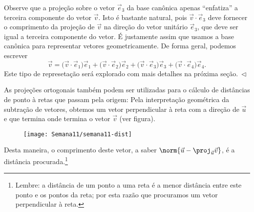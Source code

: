 \begin{ex}
\begin{equation}
	\end{equation} Observe que a projeção sobre o vetor $\vec{e}_3$ da base canônica apenas ``enfatiza'' a terceira componente do vetor $\vec{v}$. Isto é bastante natural, pois $\vec{v} \cdot \vec{e}_3$ deve fornecer o comprimento da projeção de $\vec{v}$ na direção do vetor unitário $\vec{e}_3$, que deve ser igual a terceira componente do vetor. É justamente assim que usamos a base canônica para representar vetores geometricamente. De forma geral, podemos escrever
	\begin{equation}
	\vec{v} = \big( \vec{v} \cdot \vec{e}_1 \big) \vec{e}_1 + \big( \vec{v} \cdot \vec{e}_2 \big) \vec{e}_2  + \big( \vec{v} \cdot \vec{e}_3 \big) \vec{e}_3  + \big( \vec{v} \cdot \vec{e}_4 \big) \vec{e}_4.
	\end{equation} Este tipo de represetação será explorado com mais detalhes na próxima seção$. \ \lhd$
\end{ex}

As projeções ortogonais também podem ser utilizadas para o cálculo de distâncias de ponto à retas que passam pela origem: Pela interpretação geométrica da subtração de vetores, obtemos um vetor perpendicular à reta com a direção de $\vec{u}$ e que termina onde termina o vetor $\vec{v}$ (ver figura).
\begin{figure}[h!]
	\begin{center}
		\texttt{[image: Semana11/semana11-dist]}
	\end{center}
\end{figure}

\noindent Desta maneira, o comprimento deste vetor, a saber $\norm{\vec{u} - \proj_{\vec{u}} \vec{v}}$, é a distância procurada.\footnote{Lembre: a distância de um ponto a uma reta é a menor distância entre este ponto e os pontos da reta; por esta razão que procuramos um vetor perpendicular à reta.}

